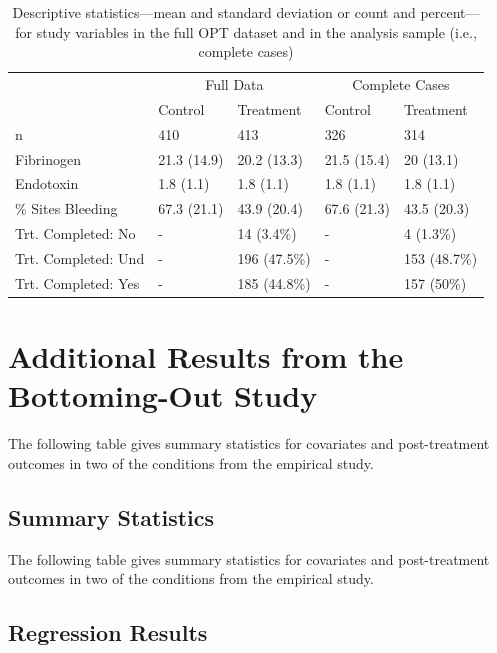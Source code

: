 \documentclass[]{article}
\begin{document}
\begin{table}

\caption{\label{tab:optTab1}Descriptive statistics---mean and standard deviation or count and percent---for study variables in the full OPT dataset and in the analysis sample (i.e., complete cases)}
\centering
\begin{tabular}[t]{lllll}
\toprule
\multicolumn{1}{c}{ } & \multicolumn{2}{c}{Full Data} & \multicolumn{2}{c}{Complete Cases} \\
\cmidrule(l{3pt}r{3pt}){2-3} \cmidrule(l{3pt}r{3pt}){4-5}
  & Control & Treatment & Control & Treatment\\
\midrule
n & 410 & 413 & 326 & 314\\
Fibrinogen & 21.3 (14.9) & 20.2 (13.3) & 21.5 (15.4) & 20 (13.1)\\
Endotoxin & 1.8 (1.1) & 1.8 (1.1) & 1.8 (1.1) & 1.8 (1.1)\\
\% Sites Bleeding & 67.3 (21.1) & 43.9 (20.4) & 67.6 (21.3) & 43.5 (20.3)\\
Trt. Completed: No & - & 14 (3.4\%) & - & 4 (1.3\%)\\
\addlinespace
Trt. Completed: Und & - & 196 (47.5\%) & - & 153 (48.7\%)\\
Trt. Completed: Yes & - & 185 (44.8\%) & - & 157 (50\%)\\
\bottomrule
\end{tabular}
\end{table}


\FloatBarrier
\section{Additional Results from the Bottoming-Out Study}
\singlespacing
The following table gives summary statistics for covariates and post-treatment outcomes in two of the conditions from the empirical study.\\

\FloatBarrier
\subsection{Summary Statistics}
\FloatBarrier

The following table gives summary statistics for covariates and post-treatment outcomes in two of the conditions from the empirical study.\\
\small


\small

\FloatBarrier
\subsection{Regression Results}
\FloatBarrier
\end{document}
